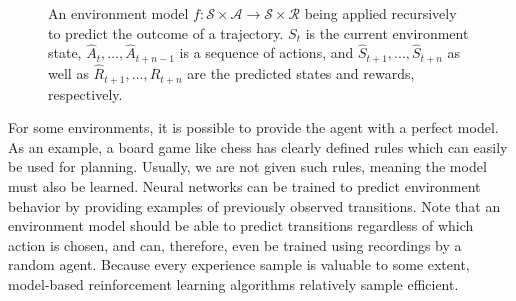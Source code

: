 \begin{figure}[ht]
    \centering
    \caption{An environment model $f : \mathscr{S} \times \mathscr{A} \to \mathscr{S} \times \mathscr{R}$ being applied recursively to predict the outcome of a trajectory. $S_t$ is the current environment state, $\hat{A}_t, ..., \hat{A}_{t+n-1}$ is a sequence of actions, and $\hat{S}_{t+1}, ..., \hat{S}_{t+n}$ as well as $\hat{R}_{t+1}, ..., \hat{R}_{t+n}$ are the predicted states and rewards, respectively.}
    \label{fig:recursive_model}
\end{figure}

For some environments, it is possible to provide the agent with a perfect model. As an example, a board game like chess has clearly defined rules which can easily be used for planning. Usually, we are not given such rules, meaning the model must also be learned. Neural networks can be trained to predict environment behavior by providing examples of previously observed transitions. Note that an environment model should be able to predict transitions regardless of which action is chosen, and can, therefore, even be trained using recordings by a random agent. Because every experience sample is valuable to some extent, model-based reinforcement learning algorithms relatively sample efficient.

